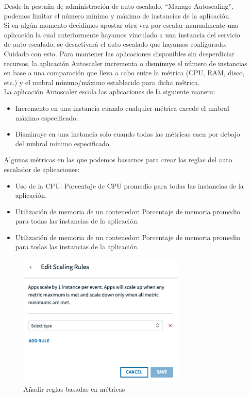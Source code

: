 \documentclass[a4paper,11pt]{article}
\begin{document}
Desde la pestaña de administración de auto escalado, “Manage Autoscaling”, podemos limitar el número mínimo y máximo de instancias de la aplicación.\\
Si en algún momento decidimos apostar otra vez por escalar manualmente una aplicación la cual anteriormente hayamos vinculado a una instancia del servicio de auto escalado, se desactivará el auto escalado que hayamos configurado. Cuidado con esto.
Para mantener las aplicaciones disponibles sin desperdiciar recursos, la aplicación Autoscaler incrementa o disminuye el número de instancias en base a una comparación que lleva a cabo entre la métrica (CPU, RAM, disco, etc.) y el umbral mínimo/máximo establecido para dicha métrica.\\
La aplicación Autoscaler escala las aplicaciones de la siguiente manera:
\begin{itemize}
  \item Incremento en una instancia cuando cualquier métrica excede el umbral máximo especificado.
  \item Disminuye en una instancia solo cuando todas las métricas caen por debajo del umbral mínimo especificado.
\end{itemize}
Algunas métricas en las que podemos basarnos para crear las reglas del auto escalador de aplicaciones:
\begin{itemize}
  \item Uso de la CPU: Porcentaje de CPU promedio para todas las instancias de la aplicación.
  \item Utilización de memoria de un contenedor: Porcentaje de memoria promedio para todas las instancias de la aplicación.
  \item Utilización de memoria de un contenedor: Porcentaje de memoria promedio para todas las instancias de la aplicación.
\end{itemize}
\begin{figure}[H]
    \centering
    \includegraphics[width=0.75\textwidth]{fran3.png}
    \caption{Añadir reglas basadas en métricas}
    \label{fig:fran3}
\end{figure}
\end{document}
